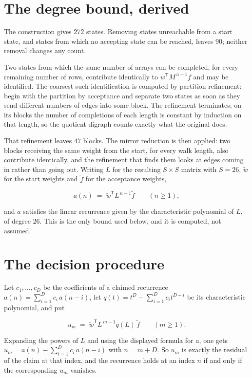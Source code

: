 \documentclass[11pt]{article}
\theoremstyle{definition}
\begin{document}
\section{The degree bound, derived}

The construction gives $272$ states. Removing states unreachable from a start state, and states from which no accepting state can be reached, leaves $90$; neither removal changes any count.

Two states from which the same number of arrays can be completed, for every remaining number of rows, contribute identically to $w^{\mathsf T}M^{\,n-1}f$ and may be identified. The coarsest such identification is computed by partition refinement: begin with the partition by acceptance and separate two states as soon as they send different numbers of edges into some block. The refinement terminates; on its blocks the number of completions of each length is constant by induction on that length, so the quotient digraph counts exactly what the original does.

That refinement leaves $47$ blocks. The mirror reduction is then applied: two blocks receiving the same weight from the start, for every walk length, also contribute identically, and the refinement that finds them looks at edges coming in rather than going out. Writing $L$ for the resulting $S \times S$ matrix with $S = 26$, $\tilde w$ for the start weights and $\tilde f$ for the acceptance weights,

\[a(n) \;=\; \tilde w^{\mathsf T} L^{\,n-1} \tilde f \qquad (n \ge 1),\]

and $a$ satisfies the linear recurrence given by the characteristic polynomial of $L$, of degree $26$. This is the only bound used below, and it is computed, not assumed.

\section{The decision procedure}

Let $c_1,\dots,c_D$ be the coefficients of a claimed recurrence $a(n) = \sum_{i=1}^{D} c_i\,a(n-i)$, let $q(t) = t^{D} - \sum_{i=1}^{D} c_i t^{D-i}$ be its characteristic polynomial, and put

\[u_m \;=\; \tilde w^{\mathsf T} L^{\,m-1} q(L)\,\tilde f \qquad (m \ge 1).\]

Expanding the powers of $L$ and using the displayed formula for $a$, one gets $u_m = a(n) - \sum_{i=1}^{D} c_i\,a(n-i)$ with $n = m + D$. So $u_m$ is exactly the residual of the claim at that index, and the recurrence holds at an index $n$ if and only if the corresponding $u_m$ vanishes.
\end{document}
